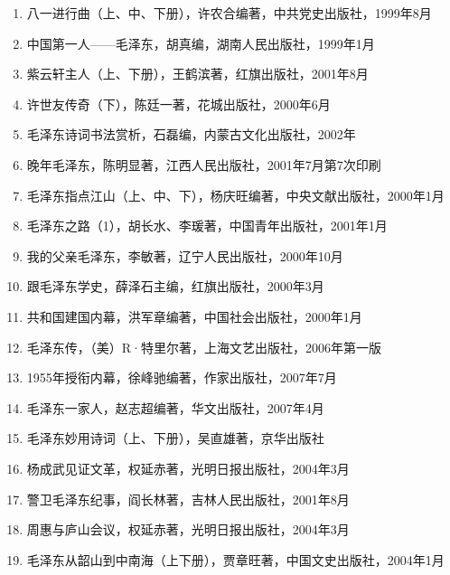 \documentclass[../dazhuan.tex]{subfiles}
\begin{document}
\begin{enumerate}
\item 八一进行曲（上、中、下册），许农合编著，中共党史出版社，1999年8月

\item 中国第一人——毛泽东，胡真编，湖南人民出版社，1999年1月

\item 紫云轩主人（上、下册），王鹤滨著，红旗出版社，2001年8月

\item 许世友传奇（下），陈廷一著，花城出版社，2000年6月

\item 毛泽东诗词书法赏析，石磊编，内蒙古文化出版社，2002年

\item 晚年毛泽东，陈明显著，江西人民出版社，2001年7月第7次印刷

\item 毛泽东指点江山（上、中、下），杨庆旺编著，中央文献出版社，2000年1月

\item 毛泽东之路（1），胡长水、李瑗著，中国青年出版社，2001年1月

\item 我的父亲毛泽东，李敏著，辽宁人民出版社，2000年10月

\item 跟毛泽东学史，薛泽石主编，红旗出版社，2000年3月

\item 共和国建国内幕，洪军章编著，中国社会出版社，2000年1月

\item 毛泽东传，（美）R·特里尔著，上海文艺出版社，2006年第一版

\item 1955年授衔内幕，徐峰驰编著，作家出版社，2007年7月

\item 毛泽东一家人，赵志超编著，华文出版社，2007年4月

\item 毛泽东妙用诗词（上、下册），吴直雄著，京华出版社

\item 杨成武见证文革，权延赤著，光明日报出版社，2004年3月

\item 警卫毛泽东纪事，阎长林著，吉林人民出版社，2001年8月

\item 周惠与庐山会议，权延赤著，光明日报出版社，2004年3月

\item 毛泽东从韶山到中南海（上下册），贾章旺著，中国文史出版社，2004年1月


\end{enumerate}
\end{document}

